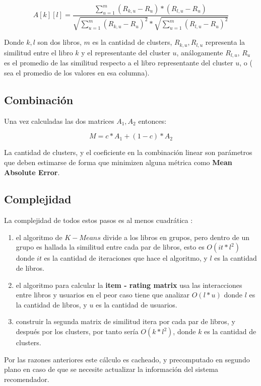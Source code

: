 \documentclass[14pt]{extarticle}
\begin{document}
$$A[k][l] = \frac{ \sum_{u = 1}^m (R_{k, u} - R_u)*(R_{l, u} - R_u) }{ \sqrt{\sum_{u = 1}^m (R_{k, u} - R_u)^2} * \sqrt{\sum_{u = 1}^m (R_{l, u} - R_u)^2} }$$

Donde $k, l$ son dos libros, $m$ es la cantidad de clusters, $R_{k,u}, R_{l,u}$ representa la similitud entre el libro $k$ y el representante del cluster $u$, análogamente $R_{l, u}$, $R_u$ es el promedio de las similitud respecto a el libro representante del cluster $u$, o ( sea el promedio de los valores en esa columna).

\subsection{Combinación}

Una vez calculadas las dos matrices $A_1, A_2$ entonces:

$$M = c * A_1 + (1-c) * A_2$$

La cantidad de clusters, y el coeficiente en la combinación linear son parámetros que deben estimarse de forma que minimizen alguna métrica como \textbf{Mean Absolute Error}.

\subsection{Complejidad}

La complejidad de todos estos pasos es al menos cuadrática : 

\begin{enumerate}
    \item el algoritmo de $K-Means$ divide a los libros en grupos, pero dentro de un  grupo es hallada la similitud entre cada par de libros, esto es $O(it * l^2)$ donde $it$ es la cantidad de iteraciones que hace el algoritmo, y $l$ es la cantidad de libros.

    \item el algoritmo para calcular la \textbf{item - rating matrix} usa las interacciones entre libros y usuarios en el peor caso tiene que analizar $O(l * u)$ donde $l$ es la cantidad de libros, y $u$ es la cantidad de usuarios.
    
    \item construir la segunda matrix de similitud itera por cada par de libros, y después por los clusters, por tanto sería $O( k * l^2)$, donde $k$ es la cantidad de clusters.
\end{enumerate}
     
Por las razones anteriores este cálculo es cacheado, y precomputado en segundo plano en caso de que se necesite actualizar la información del sistema recomendador.
\end{document}
